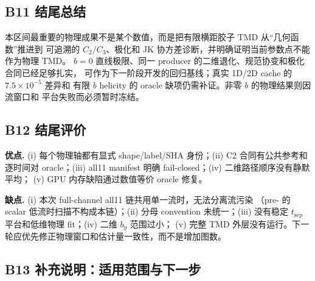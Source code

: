 \documentclass[UTF8]{ctexart}
\newcommand{\code}[1]{\texttt{\detokenize{#1}}}
\newcommand{\ts}{t_{\mathrm{sep}}}
\begin{document}
\subsection{B11 结尾总结}

\begin{conclbox}
本区间最重要的物理成果不是某个数值，而是把有限横距胶子 TMD 从“几何函数”推进到
可追溯的 \(C_2/C_3\)、极化和 JK 协方差诊断，并明确证明当前参数点不能作为物理 TMD。
\(b=0\) 直线极限、同一 producer 的二维退化、规范协变和极化合同已经足够扎实，
可作为下一阶段开发的回归基线；真实 1D/2D cache 的 \(7.5\times10^{-5}\) 差异和
有限 \(b\) helicity 的 oracle 缺项仍需补证。非零 \(b\) 的物理结果则因流窗口和
平台失败而必须暂时冻结。
\end{conclbox}

\subsection{B12 结尾评价}

\textbf{优点.} (i) 每个物理轴都有显式 shape/label/SHA 身份；(ii) C2 合同有公共参考和
逐时间对 oracle；(iii) all11 manifest 明确 fail-closed；(iv) 二维路径顺序没有静默平均；
(v) GPU 内存缺陷通过数值等价 oracle 修复。

\textbf{缺点.} (i) 本次 full-channel all11 链共用单一流时，无法分离流污染
（pre-\code{dev25} 的 scalar 低流时扫描不构成本链）；(ii) 分母 convention
未统一；(iii) 没有稳定 \(\ts\) 平台和低维物理 fit；(iv) 二维 \(b_y\) 范围过小；
(v) 完整 TMD 外层没有运行。下一轮应优先修正物理窗口和估计量一致性，而不是增加图数。

\subsection{B13 补充说明：适用范围与下一步}
\end{document}

